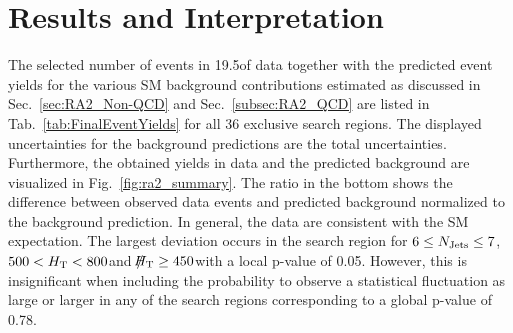 \section{Results and Interpretation}
\label{sec:RA2_results}
The selected number of events in 19.5\fbinv of data together with the predicted event yields for the various SM background contributions estimated as discussed in Sec.~\ref{sec:RA2_Non-QCD} and Sec.~\ref{subsec:RA2_QCD} are listed in Tab.~\ref{tab:FinalEventYields} for all 36 exclusive search regions. The displayed uncertainties for the background predictions are the total uncertainties. Furthermore, the obtained yields in data and the predicted background are visualized in Fig.~\ref{fig:ra2_summary}. The ratio in the bottom shows the difference between observed data events and predicted background normalized to the background prediction. In general, the data are consistent with the SM expectation. The largest deviation occurs in the search region for $6 \leq N_{\text{Jets}} \leq 7$, $500 < H_{\text{T}} < 800$\gev and $\slash\mkern-12mu{H}_{\text{T}} \ge 450$\gev with a local p-value of 0.05. However, this is insignificant when including the probability to observe a statistical fluctuation as large or larger in any of the search regions corresponding to a global p-value of 0.78. 
